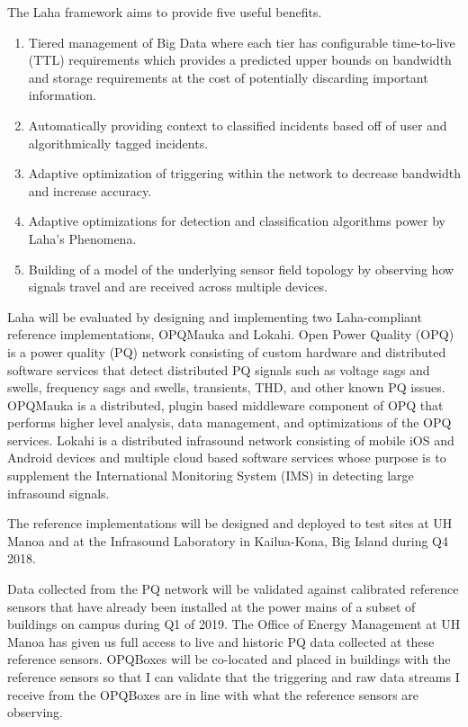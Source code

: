 The Laha framework aims to provide five useful benefits.
\begin{enumerate}
	\item Tiered management of Big Data where each tier has configurable time-to-live (TTL) requirements which provides a predicted upper bounds on bandwidth and storage requirements at the cost of potentially discarding important information.
	\item Automatically providing context to classified incidents based off of user and algorithmically tagged incidents. 
	\item Adaptive optimization of triggering within the network to decrease bandwidth and increase accuracy.
	\item Adaptive optimizations for detection and classification algorithms power by Laha's Phenomena.
	\item Building of a model of the underlying sensor field topology by observing how signals travel and are received across multiple devices.
\end{enumerate}

Laha will be evaluated by designing and implementing two Laha-compliant reference implementations, OPQMauka and Lokahi. Open Power Quality (OPQ) is a power quality (PQ) network consisting of custom hardware and distributed software services that detect distributed PQ signals such as voltage sags and swells, frequency sags and swells, transients, THD, and other known PQ issues. OPQMauka is a distributed, plugin based middleware component of OPQ that performs higher level analysis, data management, and optimizations of the OPQ services. Lokahi is a distributed infrasound network consisting of mobile iOS and Android devices and multiple cloud based software services whose purpose is to supplement the International Monitoring System (IMS) in detecting large infrasound signals.

The reference implementations will be designed and deployed to test sites at UH Manoa and at the Infrasound Laboratory in Kailua-Kona, Big Island during Q4 2018. 

Data collected from the PQ network will be validated against calibrated reference sensors that have already been installed at the power mains of a subset of buildings on campus during Q1 of 2019. The Office of Energy Management at UH Manoa has given us full access to live and historic PQ data collected at these reference sensors. OPQBoxes will be co-located and placed in buildings with the reference sensors so that I can validate that the triggering and raw data streams I receive from the OPQBoxes are in line with what the reference sensors are observing.

